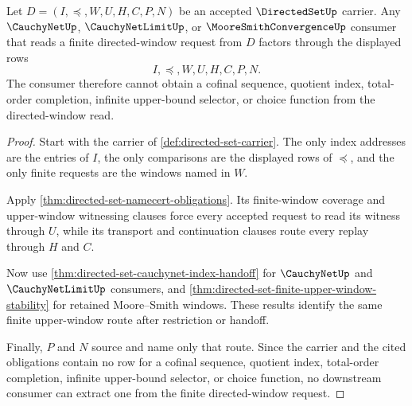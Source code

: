 \begin{theorem}
\label{thm:directed-set-upper-window-exhaustion}
Let $D=(I,\preceq,W,U,H,C,P,N)$ be an accepted $\DirectedSetUp$ carrier. Any $\CauchyNetUp$, $\CauchyNetLimitUp$, or $\MooreSmithConvergenceUp$ consumer that reads a finite directed-window request from $D$ factors through the displayed rows
$$
I,\preceq,W,U,H,C,P,N .
$$
The consumer therefore cannot obtain a cofinal sequence, quotient index, total-order completion, infinite upper-bound selector, or choice function from the directed-window read.
\end{theorem}
\begin{proof}
Start with the carrier of \autoref{def:directed-set-carrier}. The only index addresses are the entries of $I$, the only comparisons are the displayed rows of $\preceq$, and the only finite requests are the windows named in $W$.

Apply \autoref{thm:directed-set-namecert-obligations}. Its finite-window coverage and upper-window witnessing clauses force every accepted request to read its witness through $U$, while its transport and continuation clauses route every replay through $H$ and $C$.

Now use \autoref{thm:directed-set-cauchynet-index-handoff} for $\CauchyNetUp$ and $\CauchyNetLimitUp$ consumers, and \autoref{thm:directed-set-finite-upper-window-stability} for retained Moore--Smith windows. These results identify the same finite upper-window route after restriction or handoff.

Finally, $P$ and $N$ source and name only that route. Since the carrier and the cited obligations contain no row for a cofinal sequence, quotient index, total-order completion, infinite upper-bound selector, or choice function, no downstream consumer can extract one from the finite directed-window request.
\end{proof}

